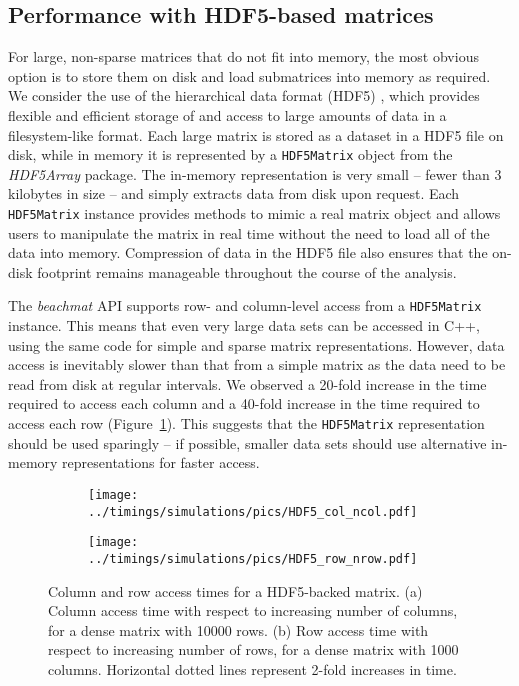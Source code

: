 \documentclass[10pt,letterpaper]{article}
\newcommand{\beachmat}{\textit{beachmat}}
\newcommand{\code}[1]{\texttt{#1}}
\begin{document}
\subsection*{Performance with HDF5-based matrices}
For large, non-sparse matrices that do not fit into memory, the most obvious option is to store them on disk and load submatrices into memory as required.
We consider the use of the hierarchical data format (HDF5) \cite{hdf5}, which provides flexible and efficient storage of and access to large amounts of data in a filesystem-like format.
Each large matrix is stored as a dataset in a HDF5 file on disk, while in memory it is represented by a \code{HDF5Matrix} object from the \textit{HDF5Array} package.
The in-memory representation is very small -- fewer than 3 kilobytes in size -- and simply extracts data from disk upon request.
Each \code{HDF5Matrix} instance provides methods to mimic a real matrix object and allows users to manipulate the matrix in real time without the need to load all of the data into memory.
Compression of data in the HDF5 file also ensures that the on-disk footprint remains manageable throughout the course of the analysis.

The \beachmat{} API supports row- and column-level access from a \code{HDF5Matrix} instance.
This means that even very large data sets can be accessed in C++, using the same code for simple and sparse matrix representations.
However, data access is inevitably slower than that from a simple matrix as the data need to be read from disk at regular intervals.
We observed a 20-fold increase in the time required to access each column and a 40-fold increase in the time required to access each row (Figure~\ref{fig:hdf5time}).
This suggests that the \code{HDF5Matrix} representation should be used sparingly -- if possible, smaller data sets should use alternative in-memory representations for faster access.

\begin{figure}[bt]
    \begin{subfigure}[b]{0.49\textwidth}
        \texttt{[image: ../timings/simulations/pics/HDF5\_col\_ncol.pdf]}
        \caption{}
    \end{subfigure}
    \begin{subfigure}[b]{0.49\textwidth}
        \texttt{[image: ../timings/simulations/pics/HDF5\_row\_nrow.pdf]}
        \caption{}
    \end{subfigure}
    \caption{Column and row access times for a HDF5-backed matrix.
        (a) Column access time with respect to increasing number of columns, for a dense matrix with 10000 rows.
        (b) Row access time with respect to increasing number of rows, for a dense matrix with 1000 columns.
        Horizontal dotted lines represent 2-fold increases in time.
    }
    \label{fig:hdf5time}
\end{figure}
\end{document}
